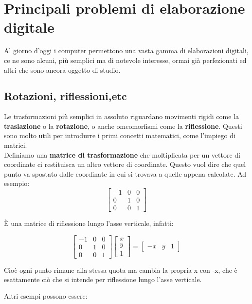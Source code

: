 \section{Principali problemi di elaborazione digitale}

Al giorno d'oggi i computer permettono una vasta gamma di elaborazioni digitali, ce ne sono alcuni, più semplici ma di notevole interesse, ormai già perfezionati ed altri che sono ancora oggetto di studio.

\subsection{Rotazioni, riflessioni,etc}
\cite{storia}
Le trasformazioni più semplici in assoluto riguardano movimenti rigidi come la \textbf{traslazione} o la \textbf{rotazione}, o anche omeomorfismi come la \textbf{riflessione}. Questi sono molto utili per introdurre i primi concetti matematici, come l'impiego di matrici.\\
Definiamo una \textbf{matrice di trasformazione} che moltiplicata per un vettore di coordinate ci restituisca un altro vettore di coordinate. Questo vuol dire che quel punto va spostato dalle coordinate in cui si trovava a quelle appena calcolate. Ad esempio:\\

$$
{\begin{bmatrix}
-1&0&0\\
0&1&0\\
0&0&1
\end{bmatrix}}
$$


\`E una matrice di riflessione lungo l'asse verticale, infatti: 

$$
{\begin{bmatrix}
-1&0&0\\
0&1&0\\
0&0&1
\end{bmatrix}}
\begin{bmatrix}
x\\y\\1
\end{bmatrix}
=
\begin{bmatrix}
-x&y&1
\end{bmatrix}
$$	

\vspace{1em} \noindent
Cioè ogni punto rimane alla stessa quota ma cambia la propria x con -x, che è esattamente ciò che si intende per riflessione lungo l'asse verticale.

\noindent 
Altri esempi possono essere:

